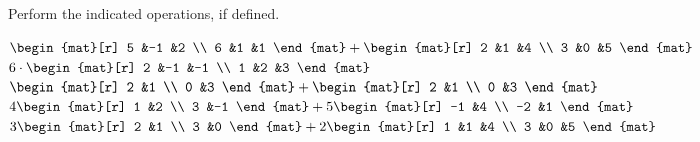 \begin{exercises}
  \recommended \item
    Perform the indicated operations, if defined.
    \begin{exparts}
      \partsitem \( \begin{mat}[r]
                 5  &-1  &2  \\
                 6  &1   &1
               \end{mat}
               +
               \begin{mat}[r]
                 2  &1   &4  \\
                 3  &0   &5
               \end{mat}    \)
      \partsitem \( 6\cdot\begin{mat}[r]
                 2  &-1  &-1 \\
                 1  &2   &3
               \end{mat}   \)
      \partsitem \( \begin{mat}[r]
                 2  &1  \\
                 0  &3
               \end{mat}
               +
               \begin{mat}[r]
                 2  &1  \\
                 0  &3
               \end{mat} \)
      \partsitem \( 4\begin{mat}[r]
                 1  &2  \\
                 3  &-1
               \end{mat}
               +
               5\begin{mat}[r]
                -1  &4  \\
                -2  &1
               \end{mat} \)
      \partsitem \( 3\begin{mat}[r]
                 2  &1  \\
                 3  &0
               \end{mat}
               +2
               \begin{mat}[r]
                 1  &1  &4 \\
                 3  &0  &5
               \end{mat} \)
    \end{exparts}
    \begin{answer} 
      \begin{exparts*}
        \partsitem \( \begin{mat}[r]

\end{mat}
\end{exparts*}
\end{answer}
\end{exercises}
